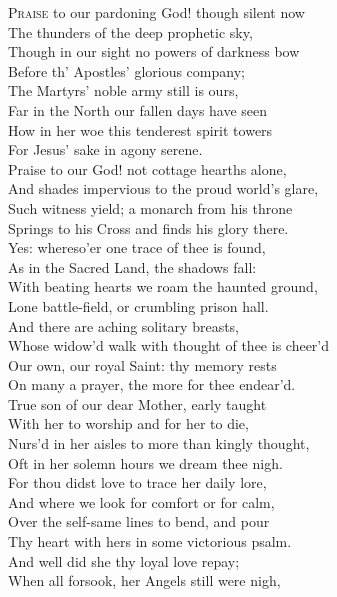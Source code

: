 \textsc{Praise} to our pardoning God! though silent now \\
 The thunders of the deep prophetic sky, \\
 Though in our sight no powers of darkness bow \\
 Before th’ Apostles’ glorious company; \\
  The Martyrs’ noble army still is ours, \\
 Far in the North our fallen days have seen \\
 How in her woe this tenderest spirit towers \\
 For Jesus’ sake in agony serene. \\
  Praise to our God! not cottage hearths alone, \\
 And shades impervious to the proud world’s glare, \\
 Such witness yield; a monarch from his throne \\
 Springs to his Cross and finds his glory there. \\
  Yes: whereso’er one trace of thee is found, \\
 As in the Sacred Land, the shadows fall: \\
 With beating hearts we roam the haunted ground, \\
 Lone battle-field, or crumbling prison hall. \\
  And there are aching solitary breasts, \\
 Whose widow’d walk with thought of thee is cheer’d \\
 Our own, our royal Saint: thy memory rests \\
 On many a prayer, the more for thee endear’d. \\
  True son of our dear Mother, early taught \\
 With her to worship and for her to die, \\
 Nurs’d in her aisles to more than kingly thought, \\
 Oft in her solemn hours we dream thee nigh. \\
  For thou didst love to trace her daily lore, \\
 And where we look for comfort or for calm, \\
 Over the self-same lines to bend, and pour \\
 Thy heart with hers in some victorious psalm. \\
  And well did she thy loyal love repay; \\
 When all forsook, her Angels still were nigh, \\

